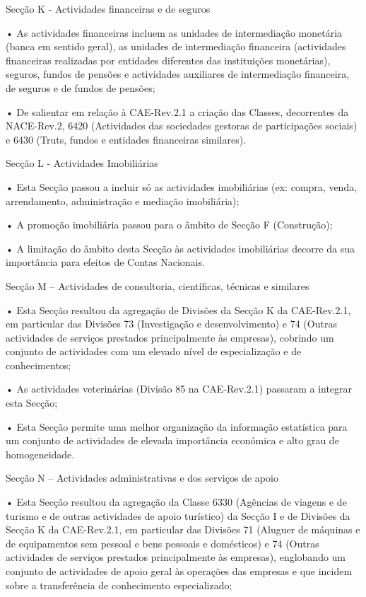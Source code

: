      Secção K - Actividades financeiras e de seguros

             • As actividades financeiras incluem as unidades de intermediação monetária (banca em sentido
               geral), as unidades de intermediação financeira (actividades financeiras realizadas por entidades
               diferentes das instituições monetárias), seguros, fundos de pensões e actividades auxiliares de
               intermediação financeira, de seguros e de fundos de pensões;

             • De salientar em relação à CAE-Rev.2.1 a criação das Classes, decorrentes da NACE-Rev.2, 6420
               (Actividades das sociedades gestoras de participações sociais) e 6430 (Truts, fundos e entidades
               financeiras similares).

     Secção L - Actividades Imobiliárias

             • Esta Secção passou a incluir só as actividades imobiliárias (ex: compra, venda, arrendamento,
               administração e mediação imobiliária);

             • A promoção imobiliária passou para o âmbito de Secção F (Construção);

             • A limitação do âmbito desta Secção às actividades imobiliárias decorre da sua importância para
               efeitos de Contas Nacionais.

     Secção M – Actividades de consultoria, científicas, técnicas e similares

             • Esta Secção resultou da agregação de Divisões da Secção K da CAE-Rev.2.1, em particular das
               Divisões 73 (Investigação e desenvolvimento) e 74 (Outras actividades de serviços prestados
               principalmente às empresas), cobrindo um conjunto de actividades com um elevado nível de
               especialização e de conhecimentos;

             • As actividades veterinárias (Divisão 85 na CAE-Rev.2.1) passaram a integrar esta Secção;

             • Esta Secção permite uma melhor organização da informação estatística para um conjunto de
               actividades de elevada importância económica e alto grau de homogeneidade.

     Secção N – Actividades administrativas e dos serviços de apoio

             • Esta Secção resultou da agregação da Classe 6330 (Agências de viagens e de turismo e de outras
               actividades de apoio turístico) da Secção I e de Divisões da Secção K da CAE-Rev.2.1, em particular
               das Divisões 71 (Aluguer de máquinas e de equipamentos sem pessoal e bens pessoais e
               domésticos) e 74 (Outras actividades de serviços prestados principalmente às empresas),
               englobando um conjunto de actividades de apoio geral às operações das empresas e que incidem
               sobre a transferência de conhecimento especializado;

